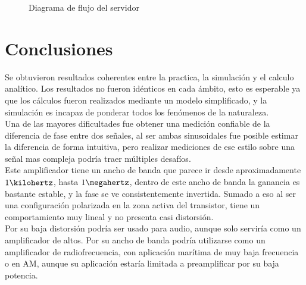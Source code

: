 \documentclass[12pt,letterpaper]{article}     %
\begin{document}
\begin{figure}[!h]
\begin{center}
	\end{center}
\caption{Diagrama de flujo del servidor}
\label{fig:diagramaServer}
\end{figure}


\clearpage
\section{Conclusiones}

Se obtuvieron resultados coherentes entre la practica, la simulación y el calculo analítico.
Los resultados no fueron idénticos en cada ámbito, esto es esperable ya que los cálculos fueron
realizados mediante un modelo simplificado, y la simulación es incapaz de ponderar todos los
fenómenos de la naturaleza.\\
Una de las mayores dificultades fue obtener una medición confiable de la diferencia de fase
entre dos señales, al ser ambas sinusoidales fue posible estimar la diferencia de forma 
intuitiva, pero realizar mediciones de ese estilo sobre una señal mas compleja podría traer 
múltiples desafíos.\\
Este amplificador tiene un ancho de banda que parece ir desde aproximadamente $1\kilohertz$,
hasta $1\megahertz$, dentro de este ancho de banda la ganancia es bastante estable, y la fase
se ve consistentemente invertida. Sumado a eso al ser una configuración polarizada en la zona
activa del transistor, tiene un comportamiento muy lineal y no presenta casi distorsión.\\
Por su baja distorsión podría ser usado para audio, aunque solo serviría como un amplificador
de altos. Por su ancho de banda podría utilizarse como un amplificador de radiofrecuencia,
con aplicación marítima de muy baja frecuencia o en AM, aunque su aplicación estaría limitada
a preamplificar por su baja potencia.
\end{document}

